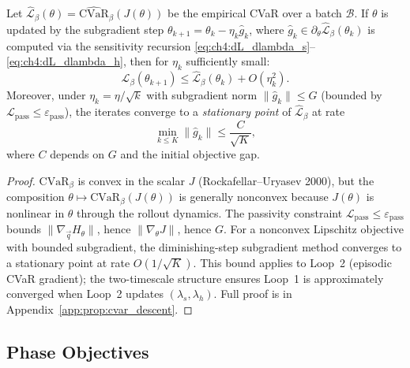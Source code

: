 \begin{proposition}
\label{prop:ch4:cvar_descent}
Let $\hat{\mathcal{L}}_\beta(\theta)=\widehat{\mathrm{CVaR}}_\beta(J(\theta))$
be the empirical CVaR over a batch $\mathcal{B}$.
If $\theta$ is updated by the subgradient step
$\theta_{k+1}=\theta_k - \eta_k\hat{g}_k$,
where $\hat{g}_k\in\partial_\theta\hat{\mathcal{L}}_\beta(\theta_k)$
is computed via the sensitivity recursion
\eqref{eq:ch4:dL_dlambda_s}--\eqref{eq:ch4:dL_dlambda_h},
then for $\eta_k$ sufficiently small:
\[
  \hat{\mathcal{L}}_\beta(\theta_{k+1})
  \leq \hat{\mathcal{L}}_\beta(\theta_k) + O(\eta_k^2).
\]
Moreover, under $\eta_k=\eta/\sqrt{k}$ with subgradient norm
$\|\hat{g}_k\|\leq G$ (bounded by
$\mathcal{L}_{\mathrm{pass}}\leq\varepsilon_{\mathrm{pass}}$),
the iterates converge to a \emph{stationary point} of
$\hat{\mathcal{L}}_\beta$ at rate
\[
  \min_{k\leq K}\|\hat{g}_k\| \leq \frac{C}{\sqrt{K}},
\]
where $C$ depends on $G$ and the initial objective gap.
\end{proposition}
\begin{proof}
$\mathrm{CVaR}_\beta$ is convex in the scalar $J$
(Rockafellar--Uryasev 2000), but the composition
$\theta\mapsto\mathrm{CVaR}_\beta(J(\theta))$ is generally nonconvex
because $J(\theta)$ is nonlinear in $\theta$ through the rollout dynamics.
The passivity constraint $\mathcal{L}_{\mathrm{pass}}\leq\varepsilon_{\mathrm{pass}}$
bounds $\|\nabla_{\vec{q}}H_\theta\|$, hence $\|\nabla_\theta J\|$,
hence $G$.
For a nonconvex Lipschitz objective with bounded subgradient, the
diminishing-step subgradient method converges to a stationary point
at rate $O(1/\sqrt{K})$.
This bound applies to Loop~2 (episodic CVaR gradient);
the two-timescale structure ensures Loop~1 is approximately converged
when Loop~2 updates $(\lambda_s,\lambda_h)$.
Full proof is in Appendix~\ref{app:prop:cvar_descent}.
\end{proof}

\subsection{Phase Objectives}
\label{subsec:ch4:phase_obj}

